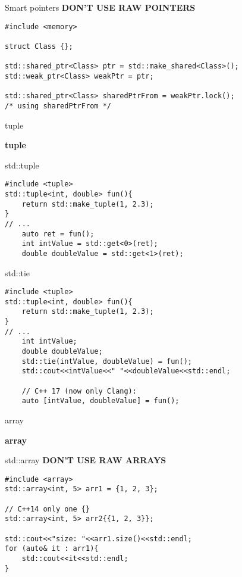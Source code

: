 \documentclass{beamer}
\begin{document}
\begin{frame}[fragile]{Smart pointers}
\textbf{DON'T USE RAW POINTERS}
\begin{lstlisting}[style=customcpp]
#include <memory>

struct Class {};

std::shared_ptr<Class> ptr = std::make_shared<Class>();
std::weak_ptr<Class> weakPtr = ptr;

std::shared_ptr<Class> sharedPtrFrom = weakPtr.lock();
/* using sharedPtrFrom */
\end{lstlisting}
\end{frame}

\begin{frame}[fragile]{tuple}
\begin{center}
{\Huge \textbf{tuple}}
\end{center}
\end{frame}

\begin{frame}[fragile]{std::tuple}
\begin{lstlisting}[style=customcpp]
#include <tuple>
std::tuple<int, double> fun(){
	return std::make_tuple(1, 2.3);
}
// ...
	auto ret = fun();
	int intValue = std::get<0>(ret);
	double doubleValue = std::get<1>(ret);

\end{lstlisting}
\end{frame}

\begin{frame}[fragile]{std::tie}
\begin{lstlisting}[style=customcpp]
#include <tuple>
std::tuple<int, double> fun(){
	return std::make_tuple(1, 2.3);
}
// ...
	int intValue;
	double doubleValue;
	std::tie(intValue, doubleValue) = fun();
	std::cout<<intValue<<" "<<doubleValue<<std::endl;
	
	// C++ 17 (now only Clang):
	auto [intValue, doubleValue] = fun();
\end{lstlisting}
\end{frame}

\begin{frame}[fragile]{array}
\begin{center}
{\Huge \textbf{array}}
\end{center}
\end{frame}

\begin{frame}[fragile]{std::array}
\textbf{DON'T USE RAW ARRAYS}
\begin{lstlisting}[style=customcpp]
#include <array>
std::array<int, 5> arr1 = {1, 2, 3};

// C++14 only one {}
std::array<int, 5> arr2{{1, 2, 3}};

std::cout<<"size: "<<arr1.size()<<std::endl;
for (auto& it : arr1){
	std::cout<<it<<std::endl;
}
\end{lstlisting}
\end{frame}
\end{document}
